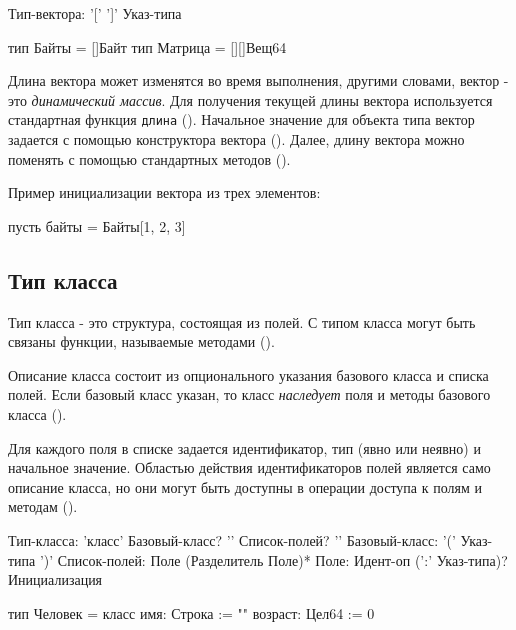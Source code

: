 \begin{Grammar}
Тип-вектора: '[' ']'  Указ-типа
\end{Grammar} 

\begin{Trivil}
тип Байты = []Байт
тип Матрица = [][]Вещ64
\end{Trivil}

Длина вектора может изменятся во время выполнения, другими словами, вектор - это \emph{динамический массив}. Для получения текущей длины вектора используется стандартная функция \verb|длина| ().
Начальное значение для объекта типа вектор задается с помощью конструктора вектора (). Далее, длину вектора можно поменять с помощью стандартных методов ().

Пример инициализации вектора из трех элементов:
\begin{Trivil}[vspace=2pt]
пусть байты = Байты[1, 2, 3]
\end{Trivil}

\hypertarget{class-types}{%
\subsection{Тип класса}\label{decls:class-types}}

Тип класса - это структура, состоящая из полей. С типом класса могут быть связаны функции, называемые методами ().

Описание класса состоит из опционального указания базового класса и списка полей. 
Если базовый класс указан, то класс \emph{наследует} поля и методы базового класса (). 

Для каждого поля в списке задается идентификатор, тип (явно или неявно) и начальное значение.
Областью действия идентификаторов полей является само описание класса, но они могут быть доступны в операции доступа к полям и методам ().

\begin{Grammar}
Тип-класса:  'класс' Базовый-класс? '{' Список-полей? '}'
Базовый-класс: '(' Указ-типа ')'
Список-полей: Поле (Разделитель Поле)*
Поле: Идент-оп (':' Указ-типа)? Инициализация
\end{Grammar} 

\begin{Trivil}
тип Человек = класс {
    имя: Строка := ""
    возраст: Цел64 := 0
}
\end{Trivil}

